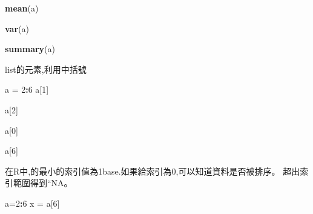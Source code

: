 \documentclass[]{book}
\newenvironment{Shaded}{\begin{snugshade}}{\end{snugshade}}
\newcommand{\KeywordTok}[1]{\textcolor[rgb]{0.13,0.29,0.53}{\textbf{#1}}}
\newcommand{\DecValTok}[1]{\textcolor[rgb]{0.00,0.00,0.81}{#1}}
\newcommand{\StringTok}[1]{\textcolor[rgb]{0.31,0.60,0.02}{#1}}
\newcommand{\OperatorTok}[1]{\textcolor[rgb]{0.81,0.36,0.00}{\textbf{#1}}}
\newcommand{\NormalTok}[1]{#1}
\theoremstyle{definition}
\theoremstyle{definition}
\theoremstyle{definition}
\theoremstyle{remark}
\begin{document}
\begin{Shaded}
\begin{Highlighting}[]
\KeywordTok{mean}\NormalTok{(a)}
\end{Highlighting}
\end{Shaded}

\begin{Shaded}
\begin{Highlighting}[]
\KeywordTok{var}\NormalTok{(a)}
\end{Highlighting}
\end{Shaded}

\begin{Shaded}
\begin{Highlighting}[]
\KeywordTok{summary}\NormalTok{(a)}
\end{Highlighting}
\end{Shaded}

list的元素,利用中括號

\begin{Shaded}
\begin{Highlighting}[]
\NormalTok{a =}\StringTok{ }\DecValTok{2}\OperatorTok{:}\DecValTok{6}
\NormalTok{a[}\DecValTok{1}\NormalTok{]}
\end{Highlighting}
\end{Shaded}

\begin{Shaded}
\begin{Highlighting}[]
\NormalTok{a[}\DecValTok{2}\NormalTok{]}
\end{Highlighting}
\end{Shaded}

\begin{Shaded}
\begin{Highlighting}[]
\NormalTok{a[}\DecValTok{0}\NormalTok{]}
\end{Highlighting}
\end{Shaded}

\begin{Shaded}
\begin{Highlighting}[]
\NormalTok{a[}\DecValTok{6}\NormalTok{]}
\end{Highlighting}
\end{Shaded}

在R中,的最小的索引值為1base.如果給索引為0,可以知道資料是否被排序。
超出索引範圍得到``NA。

\begin{Shaded}
\begin{Highlighting}[]
\NormalTok{a=}\DecValTok{2}\OperatorTok{:}\DecValTok{6}
\NormalTok{x =}\StringTok{ }\NormalTok{a[}\DecValTok{6}\NormalTok{]}
\end{Highlighting}
\end{Shaded}
\end{document}
